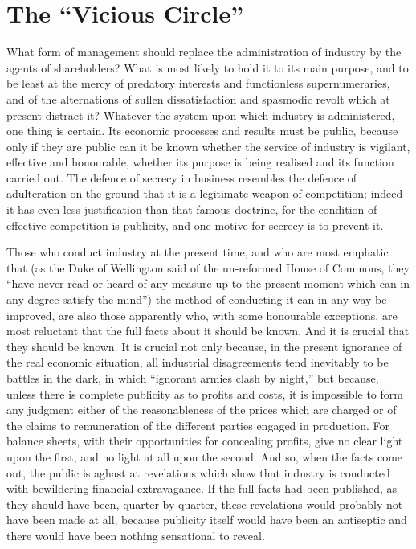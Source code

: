 \documentclass{book}
\begin{document}
\chapter{The “Vicious Circle”}
\label{chapter-7}
What form of management should replace the administration of industry by the agents of shareholders? What is most likely to hold it to its main purpose, and to be least at the mercy of predatory interests and functionless supernumeraries, and of the alternations of sullen dissatisfaction and spasmodic revolt which at present distract it? Whatever the system upon which industry is administered, one thing is certain. Its economic processes and results must be public, because only if they are public can it be known whether the service of industry is vigilant, effective and honourable, whether its purpose is being realised and its function carried out. The defence of secrecy in business resembles the defence of adulteration on the ground that it is a legitimate weapon of competition; indeed it has even less justification than that famous doctrine, for the condition of effective competition is publicity, and one motive for secrecy is to prevent it.

Those who conduct industry at the present time, and who are most emphatic that (as the Duke of Wellington said of the un-reformed House of Commons, they “have never read or heard of any measure up to the present moment which can in any degree satisfy the mind”) the method of conducting it can in any way be improved, are also those apparently who, with some honourable exceptions, are most reluctant that the full facts about it should be known. And it is crucial that they should be known. It is crucial not only because, in the present ignorance of the real economic situation, all industrial disagreements tend inevitably to be battles in the dark, in which “ignorant armies clash by night,” but because, unless there is complete publicity as to profits and costs, it is impossible to form any judgment either of the reasonableness of the prices which are charged or of the claims to remuneration of the different parties engaged in production. For balance sheets, with their opportunities for concealing profits, give no clear light upon the first, and no light at all upon the second. And so, when the facts come out, the public is aghast at revelations which show that industry is conducted with bewildering financial extravagance. If the full facts had been published, as they should have been, quarter by quarter, these revelations would probably not have been made at all, because publicity itself would have been an antiseptic and there would have been nothing sensational to reveal.
\end{document}
